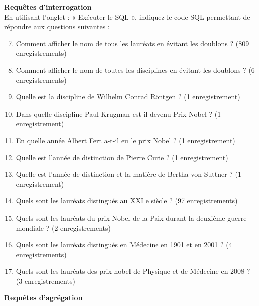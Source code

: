 \begin{exercice}
    \textbf{Requêtes d'interrogation}\\
    
    En utilisant l'onglet : « Exécuter le SQL », indiquez le code SQL permettant de répondre aux questions suivantes :\\
    
    \begin{enumerate}
        \setcounter{enumi}{6}
        \item  Comment afficher le nom de tous les lauréats en évitant les doublons ? (809 enregistrements)
        \item Comment afficher le nom de toutes les disciplines en évitant les doublons ? (6 enregistrements)
        \item  Quelle est la discipline de Wilhelm Conrad Röntgen ? (1 enregistrement)
        \item  Dans quelle discipline Paul Krugman est-il devenu Prix Nobel ? (1 enregistrement)
        \item  En quelle année Albert Fert a-t-il eu le prix Nobel ? (1 enregistrement)
        \item  Quelle est l'année de distinction de Pierre Curie ? (1 enregistrement)
        \item  Quelle est l'année de distinction et la matière de Bertha von Suttner ? (1 enregistrement)
        \item  Quels sont les lauréats distingués au XXI e siècle ? (97 enregistrements)
        \item  Quels sont les lauréats du prix Nobel de la Paix durant la deuxième guerre mondiale ? (2 enregistrements)
        \item  Quels sont les lauréats distingués en Médecine en 1901 et en 2001 ? (4 enregistrements)
        \item  Quels sont les lauréats des prix nobel de Physique et de Médecine en 2008 ? (3 enregistrements)	\\
    \end{enumerate}
    
    \textbf{Requêtes d'agrégation}\\
    

\end{exercice}
